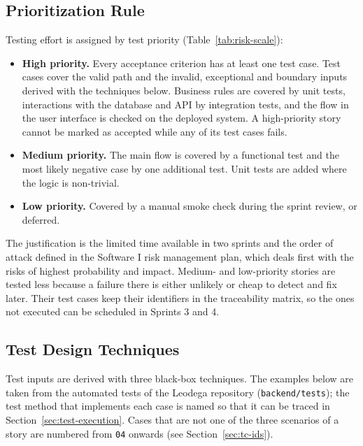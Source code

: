 \subsection{Prioritization Rule}

Testing effort is assigned by test priority (Table~\ref{tab:risk-scale}):

\begin{itemize}
  \item \textbf{High priority.} Every acceptance criterion has at least one test case. Test cases
        cover the valid path and the invalid, exceptional and boundary inputs derived with the
        techniques below. Business rules are covered by unit tests, interactions with the database
        and API by integration tests, and the flow in the user interface is checked on the
        deployed system. A
        high-priority story cannot be marked as accepted while any of its test cases fails.
  \item \textbf{Medium priority.} The main flow is covered by a functional test and the most
        likely negative case by one additional test. Unit tests are added where the logic is
        non-trivial.
  \item \textbf{Low priority.} Covered by a manual smoke check during the sprint review, or
        deferred.
\end{itemize}

The justification is the limited time available in two sprints and the order of attack defined
in the Software I risk management plan, which deals first with the risks of highest probability
and impact. Medium- and low-priority stories are tested less because a failure there is either
unlikely or cheap to detect and fix later. Their test cases keep their identifiers in the
traceability matrix, so the ones not executed can be scheduled in Sprints 3 and 4.

\subsection{Test Design Techniques}
\begingroup\sloppy %

Test inputs are derived with three black-box techniques. The examples below are taken from the
automated tests of the Leodega repository (\texttt{backend/tests}); the test method that
implements each case is named so that it can be traced in Section~\ref{sec:test-execution}.
Cases that are not one of the three scenarios of a story are numbered from \texttt{04} onwards
(see Section~\ref{sec:tc-ids}).

